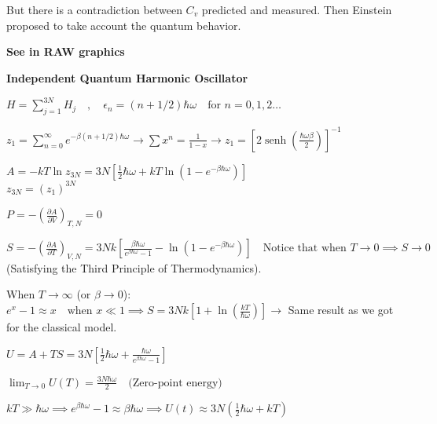 \documentclass[12pt,a4paper]{report}
\newcommand{\esp}{\vspace{0.5cm}}
\begin{document}
	\esp
	
	But there is a contradiction between $C_v$ predicted and measured. Then Einstein proposed to take account the quantum behavior.
	
	\esp
	
	\noindent \textbf{See in RAW graphics}
	
	\esp
	
	\textbf{Independent Quantum Harmonic Oscillator}
	
	\esp
	
	$H = \sum_{j=1}^{3N} H_j \quad , \quad \epsilon_n = (n + 1/2) \hbar \omega \quad \text{for } n = 0, 1, 2 \dots$
	
	\esp
	
	$z_1 = \sum_{n=0}^{\infty} e^{-\beta (n + 1/2) \hbar \omega} \to \sum x^n = \frac{1}{1-x} \to z_1 = \left[ 2 \operatorname{senh} \left( \frac{\hbar \omega \beta}{2} \right) \right]^{-1}$
	
	\esp
	
	$A = -kT \ln z_{3N} = 3N \left[ \frac{1}{2} \hbar \omega + kT \ln \left( 1 - e^{-\beta \hbar \omega} \right) \right]$ \\
	$z_{3N} = (z_1)^{3N}$
	
	\esp
	
	$P = -\left( \frac{\partial A}{\partial V} \right)_{T,N} = 0$
	
	\esp
	
	$S = -\left( \frac{\partial A}{\partial T} \right)_{V,N} = 3Nk \left[ \frac{\beta \hbar \omega}{e^{\beta \hbar \omega} - 1} - \ln \left( 1 - e^{-\beta \hbar \omega} \right) \right] \quad \text{Notice that when } T \to 0 \implies S \to 0$ \\
	(Satisfying the Third Principle of Thermodynamics).
	
	\esp
	
	When $T \to \infty$ (or $\beta \to 0$): \\
	$e^x - 1 \approx x \quad \text{when } x \ll 1 \implies S = 3Nk \left[ 1 + \ln \left( \frac{kT}{\hbar \omega} \right) \right] \to$ Same result as we got for the classical model.
	
	
	\esp
	
	$U = A + TS = 3N \left[ \frac{1}{2} \hbar \omega + \frac{\hbar \omega}{e^{\beta \hbar \omega} - 1} \right]$
	
	\esp
	
	$\lim_{T \to 0} U(T) = \frac{3N \hbar \omega}{2} \quad \text{(Zero-point energy)}$
	
	\esp
	
	$kT \gg \hbar \omega \implies e^{\beta \hbar \omega} - 1 \approx \beta \hbar \omega \implies U(t) \approx 3N \left( \frac{1}{2} \hbar \omega + kT \right)$
	
\end{document}
